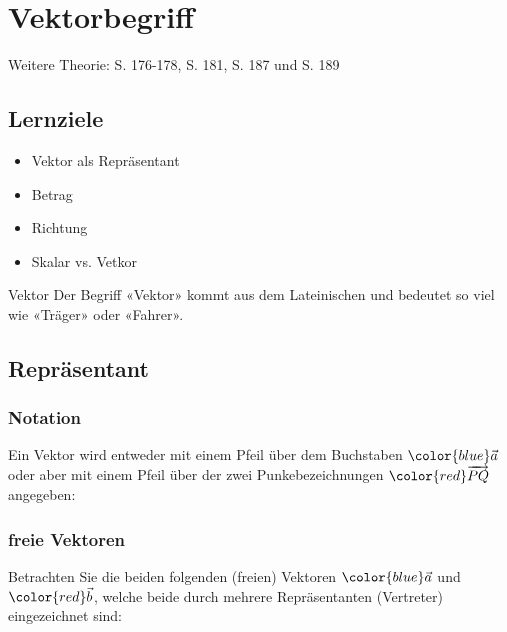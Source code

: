 \section{Vektorbegriff}

Weitere Theorie: S. 176-178, S. 181, S. 187 und S. 189


\subsection*{Lernziele}
\begin{itemize}
\item Vektor als Repräsentant
\item Betrag
\item Richtung
\item Skalar vs. Vetkor
\end{itemize}

\begin{bemerkung}{Vektor}{}
  Der Begriff «Vektor» kommt aus dem Lateinischen und bedeutet so viel
  wie «Träger» oder «Fahrer».
\end{bemerkung}
\newpage


\subsection{Repräsentant}

\subsubsection{Notation}

Ein Vektor wird entweder mit einem Pfeil über dem Buchstaben
${\color{blue}\vec{a}}$ oder aber mit einem Pfeil über der zwei
Punkebezeichnungen ${\color{red}\overrightarrow{{PQ}}}$ angegeben:

\newpage



\subsubsection{freie Vektoren}
Betrachten Sie die beiden folgenden (freien) Vektoren ${\color{blue} \vec{a}}$ und
${\color{red}\vec{b}}$, welche beide durch mehrere Repräsentanten
(Vertreter) eingezeichnet sind:

